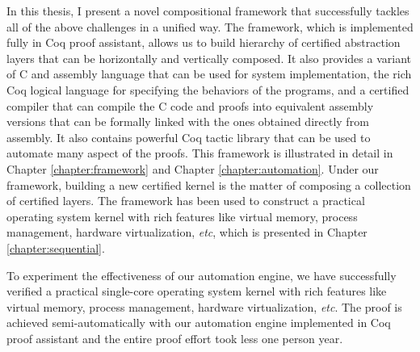 {In this thesis, I present a novel compositional  framework that successfully
tackles all of the above challenges in a unified way. The framework,
which is implemented fully in Coq proof assistant, allows
us to build hierarchy of certified abstraction layers that can be horizontally
and vertically composed. It also provides a variant of C and assembly language
that can be used for system implementation, the rich Coq logical language
for specifying the behaviors of the programs, and a certified compiler that can compile
the C code and proofs into equivalent assembly versions that can be formally linked
with the ones obtained directly from assembly. It also contains powerful
Coq tactic library that can be used to automate many aspect of the proofs.
This framework is illustrated in
detail in Chapter \ref{chapter:framework} and Chapter \ref{chapter:automation}.
Under our framework, building a new certified kernel is the matter of
composing a collection of certified layers. The framework has been used to
construct a practical operating system kernel with rich features like virtual
memory, process management, hardware virtualization, {\it etc}, which is
presented in Chapter \ref{chapter:sequential}.
}

To experiment the effectiveness of our automation engine, 
we have successfully verified a practical single-core
operating system kernel with rich features like virtual
memory, process management, hardware virtualization, {\it etc}.
The proof is achieved semi-automatically with our automation
engine implemented in Coq proof assistant and the entire proof
effort took less one person year.


